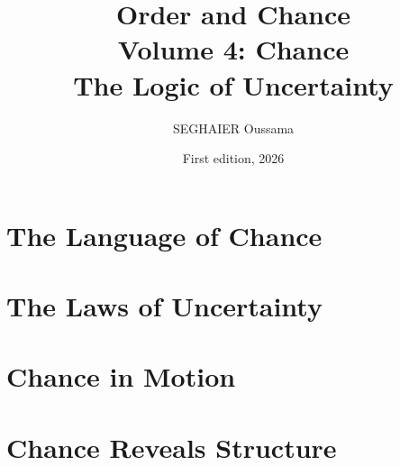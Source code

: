 \documentclass[11pt,openany]{book}
\title{\Huge\textbf{Order and Chance}\\[0.4em]\LARGE Volume 4: Chance\\[0.6em]
\Large The Logic of Uncertainty}
\author{SEGHAIER Oussama}
\date{First edition, 2026}
\begin{document}
\frontmatter
\makecover
\maketitle

\tableofcontents

\mainmatter

\part{The Language of Chance}



\part{The Laws of Uncertainty}




\part{Chance in Motion}





\part{Chance Reveals Structure}



\appendix
\setcounter{chapter}{1}




\end{document}
